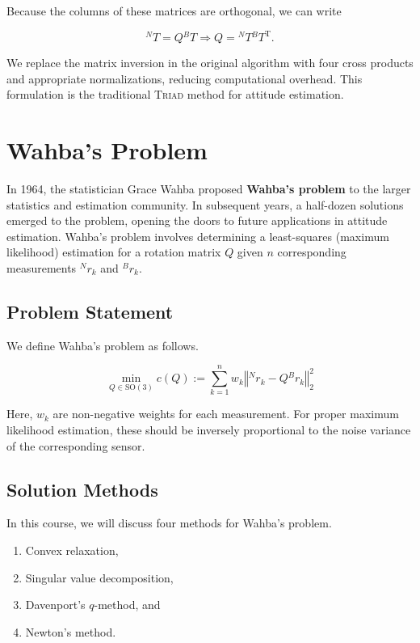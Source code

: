 \documentclass[12pt]{article}
\begin{document}
	Because the columns of these matrices are orthogonal, we can write
	
	\begin{equation}
		{}^N T = Q {}^B T \Rightarrow \boxed{ Q = {}^N T {}^B T^\mathrm{T} } .
	\end{equation}
	
	We replace the matrix inversion in the original algorithm with four cross products and appropriate normalizations, reducing computational overhead.  This formulation is the traditional \textsc{Triad} method for attitude estimation.
	
	\section{Wahba's Problem}
	
	In 1964, the statistician Grace Wahba proposed \textbf{Wahba's problem} to the larger statistics and estimation community.  In subsequent years, a half-dozen solutions emerged to the problem, opening the doors to future applications in attitude estimation.  Wahba's problem involves determining a least-squares (maximum likelihood) estimation for a rotation matrix \( Q \) given \( n \) corresponding measurements \( {}^N r_k \) and \( {}^B r_k \).
	
	\subsection{Problem Statement}
	
	We define Wahba's problem as follows.
	
	\begin{equation}
		\min_{Q \in \mathrm{SO(3)}} c(Q) := \sum_{k=1}^n w_k \left\Vert {}^N r_k - Q {}^B r_k \right\Vert_2^2
	\end{equation}
	
	Here, \( w_k \) are non-negative weights for each measurement.  For proper maximum likelihood estimation, these should be inversely proportional to the noise variance of the corresponding sensor.
	
	\subsection{Solution Methods}
	
	In this course, we will discuss four methods for Wahba's problem.
	
	\begin{enumerate}
		\item Convex relaxation,
		\item Singular value decomposition,
		\item Davenport's \( q \)-method, and
		\item Newton's method.
	\end{enumerate}
	
\end{document}
